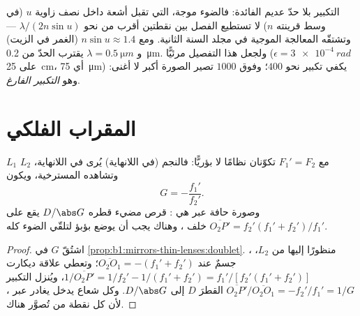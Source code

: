 \begin{remark}[حدّ التمييز]\label{rem:b1:optical-instruments:abbe}
التكبير بلا حدّ عديم الفائدة: فالضوء موجة،  التي تقبل
أشعة داخل نصف زاوية $u$ (في وسط قرينته
$n$) لا تستطيع الفصل بين نقطتين أقرب من نحو
$\lambda/(2n\sin u)$ --- وتشتقّه المعالجة الموجية في مجلد السنة الثانية.
ومع $n\sin u \approx 1.4$ (الغمر في الزيت) و $\lambda =
\qty{0.5}{\micro m}$ يقترب الحدّ من \qty{0.2}{\micro m}. ولجعل
هذا التفصيل مرئيًّا  ($\epsilon = \qty{3e-4}{rad}$ على
\qty{25}{cm}، أي \qty{75}{\micro m}) يكفي تكبير نحو $400$؛
وفوق $1000$ تصير الصورة أكبر لا أغنى: وهو
\emph{التكبير الفارغ}.
\end{remark}

\section{المقراب الفلكي}

\begin{proposition}\label{prop:b1:optical-instruments:telescope}
 $L_1$  $L_2$ مع $F_1' = F_2$ تكوّنان نظامًا
لا بؤريًّا: فالنجم (في اللانهاية) يُرى في اللانهاية، وتشاهده 
المسترخية، ويكون
\[
G = -\frac{f_1'}{f_2'} .
\]
وصورة حافة  عبر  هي
\emph{}: قرص مضيء قطره $D/\abs G$ يقع على
$\overline{O_2P'} = f_2'(f_1' + f_2')/f_1'$ خلف ، وهناك
يجب أن يوضع بؤبؤ  لتلقّي الضوء كله.
\end{proposition}

\begin{proof}
اشتُقّ $G$ في \cref{prop:b1:mirrors-thin-lenses:doublet}. ،
منظورًا إليها من $L_2$، جسمٌ عند $\overline{O_2O_1} = -(f_1'
+ f_2')$؛ وتعطي علاقة ديكارت $1/\overline{O_2P'} = 1/f_2' - 1/(f_1' + f_2')
= f_1'/[f_2'(f_1' + f_2')]$، ويُنزل التكبير $\overline{O_2P'}/
\overline{O_2O_1} = -f_2'/f_1' = 1/G$ القطرَ $D$ إلى
$D/\abs G$. وكل شعاع يدخل  يغادر عبر ، لأن كل نقطة من  تُصوَّر هناك.
\end{proof}

